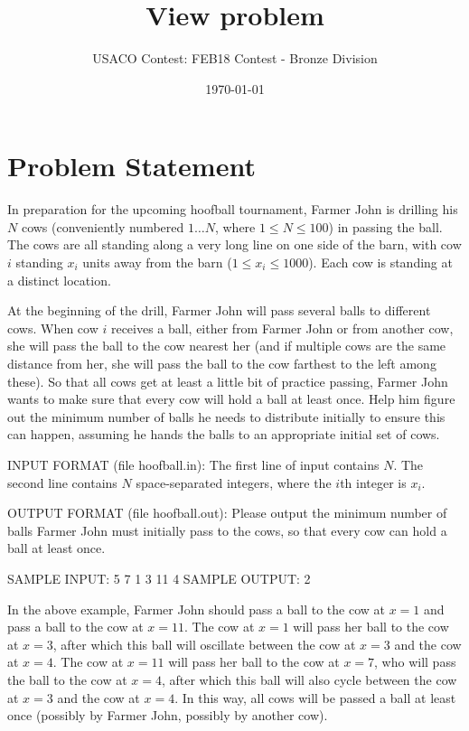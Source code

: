 \documentclass[12pt]{article}
\title{View problem}
\author{USACO Contest: FEB18 Contest - Bronze Division}
\date{\today}
\begin{document}
\maketitle

\section*{Problem Statement}

In preparation for the upcoming hoofball tournament, Farmer John is drilling his
$N$ cows (conveniently numbered $1\dots N$, where $1 \leq N \leq 100$) in
passing the ball. The cows are all standing along a very long line on one side
of the barn, with cow $i$ standing $x_i$ units away from the barn
($1 \leq x_i \leq 1000$).  Each cow is standing at a distinct location.

At the beginning of the drill, Farmer John will pass several balls to different
cows. When cow $i$ receives a ball, either from Farmer John or from another cow,
she will pass the ball to the cow nearest her (and if multiple cows are the same
distance from her, she will pass the ball to the cow farthest to the left among
these).  So that all cows get at least a little bit of practice passing, Farmer
John wants to make sure that every cow will hold a ball at least once. Help him
figure out the minimum number of balls he needs to distribute initially to
ensure this can happen, assuming he hands the balls to an appropriate initial
set of cows.

INPUT FORMAT (file hoofball.in):
The first line of input contains $N$. The second line contains $N$
space-separated integers, where the $i$th integer is $x_i$.

OUTPUT FORMAT (file hoofball.out):
Please output the minimum number of balls Farmer John must initially pass to the
cows, so that every cow can hold a ball at least once.

SAMPLE INPUT:
5
7 1 3 11 4
SAMPLE OUTPUT: 
2

In the above example, Farmer John should pass a ball to the cow at $x=1$ and
pass a ball to the cow at $x=11$. The cow at $x=1$ will pass her ball to the cow
at $x=3$, after which this ball will oscillate between the cow at $x=3$ and the
cow at $x=4$. The cow at $x=11$ will pass her ball to the cow at $x=7$, who will
pass the ball to the cow at $x=4$, after which this ball will also cycle between
the cow at $x=3$ and the cow at $x=4$. In this way, all cows will be passed a
ball at least once (possibly by Farmer John, possibly by another cow).
\end{document}
